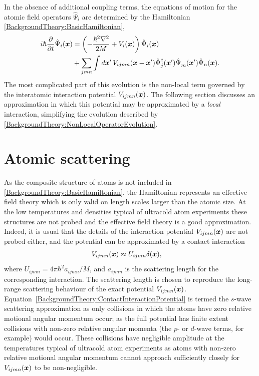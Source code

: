 In the absence of additional coupling terms, the equations of motion for the atomic field operators $\hat{\Psi}_i$ are determined by the Hamiltonian \eqref{BackgroundTheory:BasicHamiltonian},
\begin{align}
    \begin{split}
    i \hbar \frac{\partial}{\partial t}\hat{\Psi}_i(\vect{x}) &= \left( - \frac{\hbar^2 \nabla^2}{2 M}  + V_i(\vect{x}) \right) \hat{\Psi}_i(\vect{x}) \\
        &+ \sum_{jmn} \int d \vect{x}'\, V_{ijmn}(\vect{x} - \vect{x}') \hat{\Psi}_j^\dagger(\vect{x}') \hat{\Psi}_m^{\phantom{\dagger}}(\vect{x}') \hat{\Psi}_n(\vect{x}).
    \end{split}\label{BackgroundTheory:NonLocalOperatorEvolution}
\end{align}
The most complicated part of this evolution is the non-local term governed by the interatomic interaction potential $V_{ijmn}(\bm{x})$.  The following section discusses an approximation in which this potential may be approximated by a \emph{local} interaction, simplifying the evolution described by \eqref{BackgroundTheory:NonLocalOperatorEvolution}.

\section{Atomic scattering}

As the composite structure of atoms is not included in \eqref{BackgroundTheory:BasicHamiltonian}, the Hamiltonian represents an effective field theory which is only valid on length scales larger than the atomic size.  At the low temperatures and densities typical of ultracold atom experiments these structures are not probed and the effective field theory is a good approximation.  Indeed, it is usual that the details of the interaction potential $V_{ijmn}(\bm{x})$ are not probed either, and the potential can be approximated by a contact interaction \citep{Leggett:2001}
\begin{align}
    V_{ijmn}(\vect{x}) &\approx U_{ijmn} \delta(\vect{x}), \label{BackgroundTheory:ContactInteractionPotential}
\end{align}
where $U_{ijmn} = 4 \pi \hbar^2 a_{ijmn}/M$, and $a_{ijmn}$ is the scattering length for the corresponding interaction.  The scattering length is chosen to reproduce the long-range scattering behaviour of the exact potential $V_{ijmn}(\bm{x})$.  Equation~\eqref{BackgroundTheory:ContactInteractionPotential} is termed the $s$-wave scattering approximation as only collisions in which the atoms have zero relative motional angular momentum occur; as the full potential has finite extent collisions with non-zero relative angular momenta (the $p$- or $d$-wave terms, for example) would occur.  These collisions have negligible amplitude at the temperatures typical of ultracold atom experiments as atoms with non-zero relative motional angular momentum cannot approach sufficiently closely for $V_{ijmn}(\bm{x})$ to be non-negligible.

